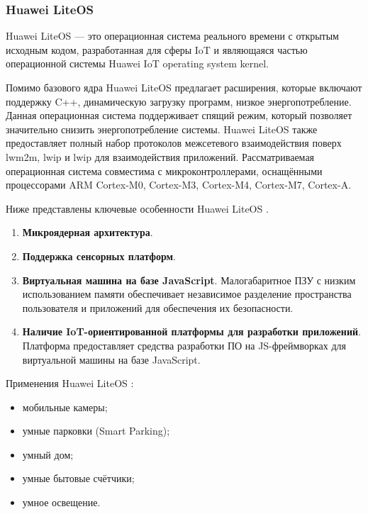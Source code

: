 \subsubsection{Huawei LiteOS}

Huawei LiteOS \cite{Huawei_LightOS_github} --- это операционная система реального времени с открытым исходным кодом, разработанная для сферы IoT и являющаяся частью операционной системы Huawei IoT operating system kernel. 

Помимо базового ядра Huawei LiteOS предлагает расширения, которые включают поддержку C++, динамическую загрузку программ, низкое энергопотребление. Данная операционная система поддерживает спящий режим, который позволяет значительно снизить энергопотребление системы. Huawei LiteOS также предоставляет полный набор протоколов межсетевого взаимодействия поверх lwm2m, lwip и lwip для взаимодействия приложений. Рассматриваемая операционная система совместима с микроконтроллерами, оснащёнными процессорами ARM Cortex-M0, Cortex-M3, Cortex-M4, Cortex-M7, Cortex-A.

Ниже представлены ключевые особенности Huawei LiteOS \cite{Huawei_LightOS_about}.

\begin{enumerate}[label*=\arabic*.]
	\item \textbf{Микроядерная архитектура}.
	\item \textbf{Поддержка сенсорных платформ}.
	\item \textbf{Виртуальная машина на базе JavaScript}. \newline
	Малогабаритное ПЗУ с низким использованием памяти обеспечивает независимое разделение пространства пользователя и приложений для обеспечения их безопасности.
	
	\item \textbf{Наличие IoT-ориентированной платформы для разработки приложений}. \newline
	Платформа предоставляет средства разработки ПО на JS-фреймворках для виртуальной машины на базе JavaScript.
	
\end{enumerate}

Применения Huawei LiteOS \cite{Huawei_LightOS_main}:

\begin{itemize}[label*=---]
	\item мобильные камеры;
	\item умные парковки (Smart Parking);
	\item умный дом;
	\item умные бытовые счётчики;
	\item умное освещение.
\end{itemize}



